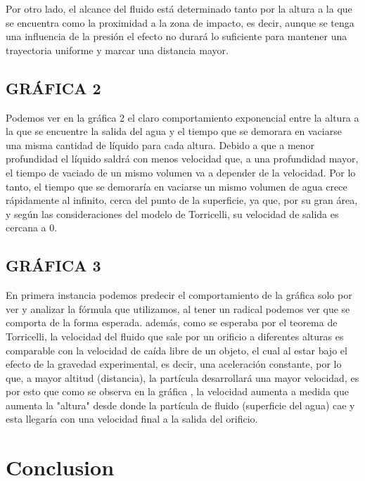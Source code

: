 \documentclass[journal,transmag]{IEEEtran}
\begin{document}
Por otro lado, el alcance del fluido está determinado tanto por la altura a la que se encuentra como la proximidad a la zona de impacto, es decir, aunque se tenga una influencia de la presión el efecto no durará lo suficiente para mantener una trayectoria uniforme y marcar una distancia mayor. 
\subsection{GRÁFICA 2}
Podemos ver en la gráfica 2 el claro comportamiento exponencial entre la altura a la que se encuentre la salida del agua y el tiempo que se demorara en vaciarse una misma cantidad de líquido para cada altura. Debido a que a menor profundidad el líquido saldrá con menos velocidad que, a una profundidad mayor, el tiempo de vaciado de un mismo volumen va a depender de la velocidad. Por lo tanto, el tiempo que se demoraría en vaciarse un mismo volumen de agua crece rápidamente al infinito, cerca del punto de la superficie, ya que, por su gran área, y según las consideraciones del modelo de Torricelli, su velocidad de salida es cercana a 0. 
\subsection{GRÁFICA 3}
En primera instancia podemos predecir el comportamiento de la gráfica solo por ver y analizar la fórmula que utilizamos, al tener un radical podemos ver que se comporta de la forma esperada. además, como se esperaba por el teorema de Torricelli, la velocidad del fluido que sale por un orificio a diferentes alturas es comparable con la velocidad de caída libre de un objeto, el cual al estar bajo el efecto de la gravedad experimental, es decir, una aceleración constante, por lo que, a mayor altitud (distancia), la partícula desarrollará una mayor velocidad, es por esto que como se observa en la gráfica , la velocidad aumenta a medida que aumenta la "altura" desde donde la partícula de fluido (superficie del agua) cae y esta llegaría con una velocidad final a la salida del orificio.  

\section{Conclusion}
	
\end{document}
